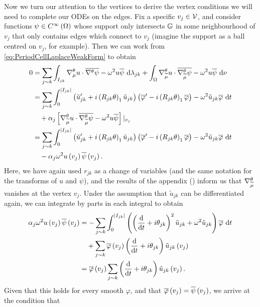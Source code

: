 Now we turn our attention to the vertices to derive the vertex conditions we will need to complete our ODEs on the edges.
Fix a specific $v_j\in \mathcal{V}$, and consider functions $\psi\in C^{\infty}\left( \Omega \right)$ whose support only intersects $\mathbb{G}$ in some neighbourhood of $v_j$ that only contains edges which connect to $v_j$ (imagine the support as a ball centred on $v_j$, for example).
Then we can work from \eqref{eq:PeriodCellLaplaceWeakForm} to obtain
\begin{align*}
	0 &= \sum_{j\sim k} \int_{I_{jk}} \nabla^{\theta}_\mu u \cdot \overline{\nabla^{\theta}\psi} - \omega^2 u\overline{\psi}  \ \mathrm{d}\lambda_{jk} 
	+ \int_{\Omega}\nabla^{\theta}_{\widetilde{\mu}}u\cdot\overline{\nabla^{\theta}_{\widetilde{\mu}}\psi}-\omega^2 u\overline{\psi} \ \mathrm{d}\nu \\
	&= \sum_{j\sim k} \int_{0}^{\left\lvert I_{jk} \right\rvert} \left( \tilde{u}_{jk}' + i\left( R_{jk}\theta \right)_1 \tilde{u}_{jk} \right)\left( \overline{\varphi}' - i\left( R_{jk}\theta \right)_1 \overline{\varphi}  \right) - \omega^2 \tilde{u}_{jk}\overline{\varphi} \ \mathrm{d} t \\
	&\quad + \alpha_j\left[  \nabla^{\theta}_{\widetilde{\mu}}u\cdot\overline{\nabla^{\theta}_{\widetilde{\mu}}\psi}-\omega^2 u\overline{\psi}  \right]\vert_{v_j} \\
	&= \sum_{j\sim k} \int_{0}^{\left\lvert I_{jk} \right\rvert} \left( \tilde{u}_{jk}' + i\left( R_{jk}\theta \right)_1 \tilde{u}_{jk} \right)\left( \overline{\varphi}' - i\left( R_{jk}\theta \right)_1 \overline{\varphi}  \right) - \omega^2 \tilde{u}_{jk}\overline{\varphi} \ \mathrm{d} t \\
	&\quad - \alpha_j \omega^2 u\left( v_j \right)\overline{\psi}\left( v_j \right).
\end{align*}
Here, we have again used $r_{jk}$ as a change of variables (and the same notation for the transforms of $u$ and $\psi$), and the results of the appendix () inform us that $\nabla^{\theta}_{\widetilde{\mu}}$ vanishes at the vertex $v_j$.
Under the assumption that $\tilde{u}_{jk}$ can be differentiated again, we can integrate by parts in each integral to obtain
\begin{align*}
	\alpha_j\omega^2 u\left( v_j \right)\overline{\psi}\left( v_j \right) &= - \sum_{j\sim k} \int_{0}^{\left\lvert I_{jk} \right\rvert} \left(  \left( \dfrac{\mathrm{d}}{\mathrm{d}t} + i\theta_{jk} \right)^2 \tilde{u}_{jk} +\omega^2 \tilde{u}_{jk}  \right)\overline{\varphi} \ \mathrm{d} t \\
	&\quad + \sum_{j\sim k}\overline{\varphi}\left( v_j \right)\left( \dfrac{\mathrm{d}}{\mathrm{d}t} + i\theta_{jk} \right)\tilde{u}_{jk}\left( v_j \right) \\
	&= \overline{\varphi}\left( v_j \right)\sum_{j\sim k}\left( \dfrac{\mathrm{d}}{\mathrm{d}t} + i\theta_{jk} \right)\tilde{u}_{jk}\left( v_j \right).
\end{align*}
Given that this holds for every smooth $\varphi$, and that $\overline{\varphi}\left( v_j \right)=\overline{\psi}\left( v_j \right)$, we arrive at the condition that
